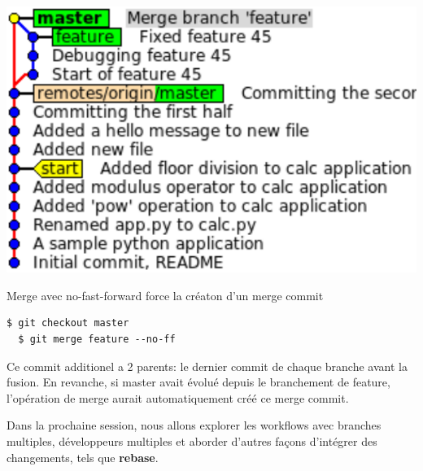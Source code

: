 \documentclass{../../common/tufte-latex/tufte-handout}
\begin{document}
\begin{marginfigure}%
  \centering
  \includegraphics[width=\linewidth]{gitmerge-noff.pdf}
  \label{fig:gitmerge-noff}
  \caption{Merge avec no-fast-forward force la créaton d'un merge commit}
\end{marginfigure}

\begin{lstlisting}[style=BashInputStyle]
  $ git checkout master
  $ git merge feature --no-ff
\end{lstlisting}

Ce commit additionel a 2 parents: le dernier commit de chaque branche avant la fusion.
En revanche, si master avait évolué depuis le branchement de feature, l'opération de merge aurait automatiquement créé ce merge commit.

Dans la prochaine session, nous allons explorer les workflows avec branches multiples, développeurs multiples et aborder d'autres façons d'intégrer des changements, tels que \textbf{rebase}.



\end{document}
